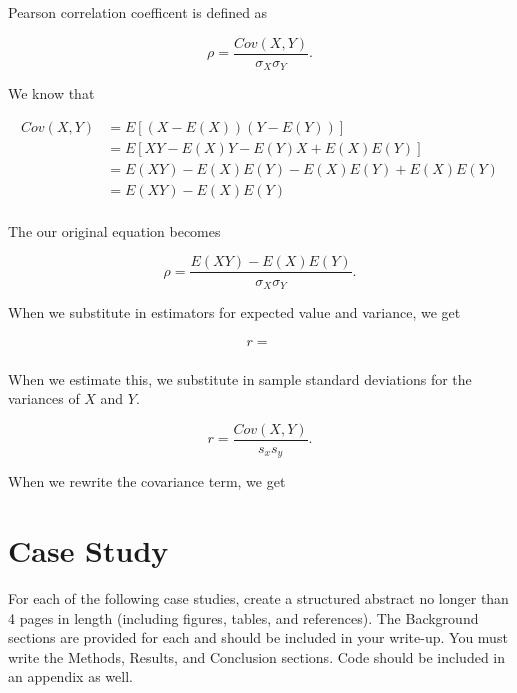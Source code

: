 \documentclass{article}
\begin{document}
\begin{enumerate}
		Pearson correlation coefficent is defined as

		$$\rho = \frac{Cov(X, Y)}{\sigma_X \sigma_Y}.$$

		We know that

		\begin{align*}
			Cov(X, Y) & = E[(X - E(X))(Y - E(Y))] \\
			& = E[XY - E(X)Y - E(Y)X + E(X)E(Y)] \\
			& = E(XY) - E(X)E(Y) - E(X)E(Y) + E(X)E(Y) \\
			& = E(XY) - E(X)E(Y) \\
		\end{align*}

		The our original equation becomes

		$$\rho = \frac{E(XY) - E(X)E(Y)}{\sigma_X \sigma_Y}.$$

		When we substitute in estimators for expected value and variance, we get

		$$r = \frac{}{} $$
		
		When we estimate this, we substitute in sample standard deviations for the variances of $X$ and $Y$.

		$$r = \frac{Cov(X, Y)}{s_x s_y}.$$

		When we rewrite the covariance term, we get 


	\end{enumerate}



	\newpage
	\section*{Case Study}
	For each of the following case studies, create a structured abstract no longer than 4 pages in length (including figures, tables, and references). The Background sections are provided for each and should be included in your write-up. You must write the Methods, Results, and Conclusion sections. Code should be included in an appendix as well.
\end{document}
